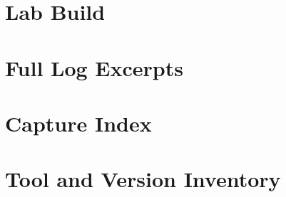 \section{Lab Build}
\unwritten

\section{Full Log Excerpts}
\unwritten

\section{Capture Index}
\unwritten

\section{Tool and Version Inventory}
\unwritten
